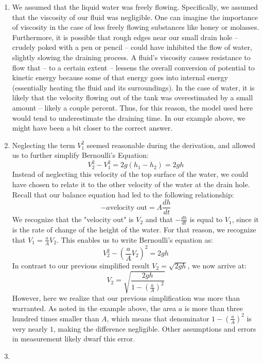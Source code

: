 \documentclass{ximera}
\begin{document}
\begin{enumerate}
    \item 
    We assumed that the liquid water was freely flowing.  Specifically, we assumed that the viscosity of our fluid was negligible.  One can imagine the importance of viscosity in the case of less freely flowing substances like honey or molasses.  Furthermore, it is possible that rough edges near our small drain hole – crudely poked with a pen or pencil – could have inhibited the flow of water, slightly slowing the draining process.  A fluid’s viscosity causes resistance to flow that – to a certain extent – lessens the overall conversion of potential to kinetic energy because some of that energy goes into internal energy (essentially heating the fluid and its surroundings).  In the case of water, it is likely that the velocity flowing out of the tank was overestimated by a small amount – likely a couple percent.  Thus, for this reason, the model used here would tend to underestimate the draining time.  In our example above, we might have been a bit closer to the correct answer. 
    \item
    Neglecting the term $V_1^2$ seemed reasonable during the derivation, and allowed us to further simplify Bernoulli’s Equation:
    $$V_2^2-V_1^2=2g(h_1-h_2)=2gh$$
    Instead of neglecting this velocity of the top surface of the water, we could have chosen to relate it to the other velocity of the water at the drain hole.  Recall that our balance equation had led to the following relationship: 
    $$-a\mbox{velocity out}=A\frac{dh}{dt}$$
    We recognize that the "velocity out" is $V_2$ and that $-\frac{dh}{dt}$ is equal to $V_1$, since it is the rate of change of the height of the water.  For that reason, we recognize that $V_1=\frac{a}{A}V_2$.  This enables us to write Bernoulli's equation as:
    $$V_2^2-\left(\frac{a}{A}V_2\right)^2=2gh$$
    In contrast to our previous simplified result $V_2=\sqrt{2gh}$, we now arrive at:
    $$V_2=\sqrt{\frac{2gh}{1-\left(\frac{a}{A}\right)^2}}$$
    However, here we realize that our previous simplification was more than warranted.  As noted in the example above, the area $a$ is more than three hundred times smaller than $A$, which means that denominator $1-\left(\frac{a}{A}\right)^2$ is very nearly $1$, making the difference negligible.  Other assumptions and errors in measurement likely dwarf this error.
    \item

\end{enumerate}
\end{document}
